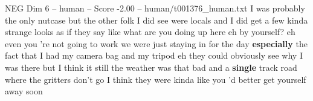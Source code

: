 \begin{textsample}{NEG Dim 6 – human – Score -2.00 – human/t001376\_human.txt}  \label{ex:f6_neg_031}
I was probably the only nutcase but the other folk I did see were locals and I did get a few kinda strange looks as if they say like what are you doing up here eh by yourself? eh even you 're not going to work we were just staying in for the day \textbf{especially} the fact that I had my camera bag and my tripod eh they could obviously see why I was there but I think it still the weather was that bad and a \textbf{single} track road where the gritters don't go I think they were kinda like you 'd better get yourself away soon

\end{textsample}
